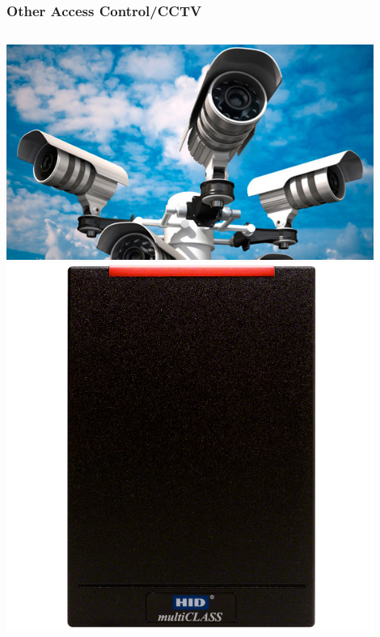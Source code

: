 \documentclass[]{beamer}
\begin{document}
\begin{frame}
  \frametitle{Other Access Control/CCTV}
  \begin{columns}
    \includegraphics[width=0.9\textwidth]{cctv}
    \includegraphics[width=0.9\textwidth]{hid-reader}
  \end{columns}
\end{frame}
\end{document}

